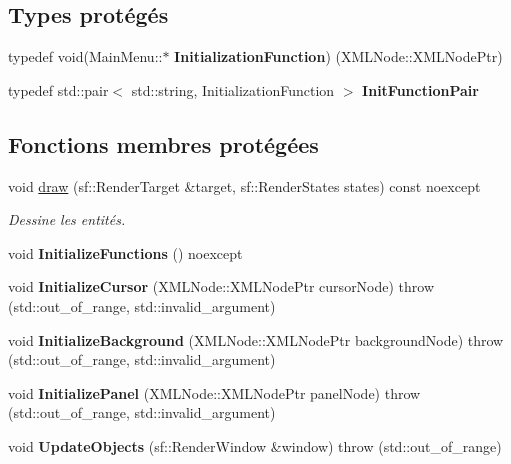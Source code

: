 \subsection*{Types protégés}
\begin{DoxyCompactItemize}
\item 
\mbox{\label{classmy_1_1MainMenu_a102ed07102cbecf38cf0553175a1256c}} 
typedef void(Main\+Menu\+::$\ast$ {\bfseries Initialization\+Function}) (X\+M\+L\+Node\+::\+X\+M\+L\+Node\+Ptr)
\item 
\mbox{\label{classmy_1_1MainMenu_a10e6c31633e05d88d7b7681fce10a397}} 
typedef std\+::pair$<$ std\+::string, Initialization\+Function $>$ {\bfseries Init\+Function\+Pair}
\end{DoxyCompactItemize}
\subsection*{Fonctions membres protégées}
\begin{DoxyCompactItemize}
\item 
\mbox{\label{classmy_1_1MainMenu_af378fdb76cb97944ee6b5501933ee669}} 
void \hyperlink{classmy_1_1MainMenu_af378fdb76cb97944ee6b5501933ee669}{draw} (sf\+::\+Render\+Target \&target, sf\+::\+Render\+States states) const noexcept
\begin{DoxyCompactList}\small\item\em Dessine les entités. \end{DoxyCompactList}\item 
\mbox{\label{classmy_1_1MainMenu_a72f1d70bd3785fda568a4eea63c5dafe}} 
void {\bfseries Initialize\+Functions} () noexcept
\item 
\mbox{\label{classmy_1_1MainMenu_a296884bc71735ca403dbf764393da846}} 
void {\bfseries Initialize\+Cursor} (X\+M\+L\+Node\+::\+X\+M\+L\+Node\+Ptr cursor\+Node)  throw (std\+::out\+\_\+of\+\_\+range, std\+::invalid\+\_\+argument)
\item 
\mbox{\label{classmy_1_1MainMenu_ac5788ee93769d1b77d613e5f3755c9ad}} 
void {\bfseries Initialize\+Background} (X\+M\+L\+Node\+::\+X\+M\+L\+Node\+Ptr background\+Node)  throw (std\+::out\+\_\+of\+\_\+range, std\+::invalid\+\_\+argument)
\item 
\mbox{\label{classmy_1_1MainMenu_abfe185e68ceb5392ec2e7a82036f6659}} 
void {\bfseries Initialize\+Panel} (X\+M\+L\+Node\+::\+X\+M\+L\+Node\+Ptr panel\+Node)  throw (std\+::out\+\_\+of\+\_\+range, std\+::invalid\+\_\+argument)
\item 
\mbox{\label{classmy_1_1MainMenu_a783a7ca45c020dc4b4774f6c71a034e4}} 
void {\bfseries Update\+Objects} (sf\+::\+Render\+Window \&window)  throw (std\+::out\+\_\+of\+\_\+range)
\end{DoxyCompactItemize}
